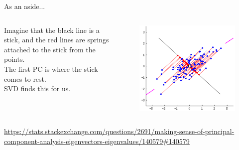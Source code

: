 \documentclass[aspectratio=169]{../latex_main/tntbeamer}  %
\begin{document}
	\begin{frame}{As an aside...}
	    \begin{columns}
	        \begin{column}{.4\textwidth}
	                Imagine that the black line is a stick, and the red lines are springs attached to the stick from the points.\\
	                \bigskip
	                The first PC is where the stick comes to rest.\\
	                \bigskip
                    SVD finds this for us.\\
                    
	        \end{column}
	        
	        
	        \begin{column}{.6\textwidth}
	                \begin{figure}
	                    \centering
	                    \includegraphics[scale=.25]{Bild19}
	                \end{figure}
	        \end{column}
	        
	        
	    \end{columns}
	    \url{https://stats.stackexchange.com/questions/2691/making-sense-of-principal-component-analysis-eigenvectors-eigenvalues/140579#140579}

	\end{frame}
	
\end{document}
